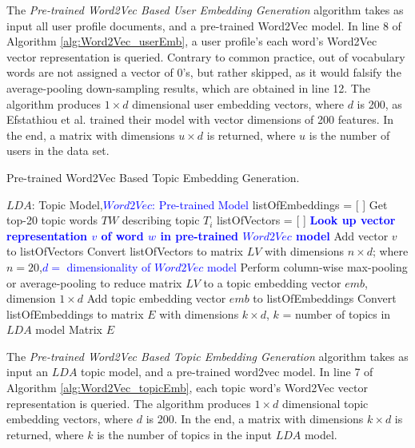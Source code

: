              The \emph{Pre-trained Word2Vec Based User Embedding Generation} algorithm takes as input all user profile documents, and a pre-trained Word2Vec model. In line 8 of Algorithm \ref{alg:Word2Vec_userEmb}, a user profile's each word's Word2Vec vector representation is queried. Contrary to common practice, out of vocabulary words are not assigned a vector of 0's, but rather skipped, as it would falsify the average-pooling down-sampling results, which are obtained in line 12. The algorithm produces $1 \times d$ dimensional user embedding vectors, where $d$ is 200, as Efstathiou et al. \cite{efstathiou2018word} trained their model with vector dimensions of 200 features. In the end, a matrix with dimensions $u \times d$ is returned, where $u$ is the number of users in the data set.
        
            \begin{algorithm}
            \caption{Pre-trained Word2Vec Based Topic Embedding Generation.}
            \label{alg:Word2Vec_topicEmb}
            \begin{algorithmic}[1]
                \REQUIRE $LDA$: Topic Model,\textcolor{blue}{$Word2Vec$: Pre-trained Model}
                \STATE listOfEmbeddings = [ ]
                    \STATE Get top-20 topic words $TW$ describing topic $T_i$
                    \STATE listOfVectors = [ ]
                    \STATE
                        \STATE \textbf{\textcolor{blue}{Look up vector representation $v$ of word $w$ in pre-trained $Word2Vec$ model}}
                        \STATE Add vector $v$ to listOfVectors
                    \ENDFOR
                    \STATE Convert listOfVectors to matrix $LV$ with dimensions $n \times d$; where $n=20$,\textcolor{blue}{$d =$  dimensionality of $Word2Vec$ model}
                    \STATE Perform column-wise max-pooling or average-pooling to reduce matrix $LV$ to a topic embedding vector $emb$, dimension $1 \times d$
                    \STATE Add topic embedding vector $emb$ to listOfEmbeddings
                \ENDFOR
                \STATE Convert listOfEmbeddings to matrix $E$ with dimensions $k \times d$,  $k$ = number of topics in $LDA$ model
                \RETURN Matrix $E$
            \end{algorithmic}
            \end{algorithm}
            
            The \emph{Pre-trained Word2Vec Based Topic Embedding Generation} algorithm takes as input an $LDA$ topic model, and a pre-trained word2vec model. In line 7 of Algorithm \ref{alg:Word2Vec_topicEmb}, each topic word's Word2Vec vector representation is queried. The algorithm produces $1 \times d$ dimensional topic embedding vectors, where $d$ is 200. In the end, a matrix with dimensions $k \times d$ is returned, where $k$ is the number of topics in the input $LDA$ model.
            
